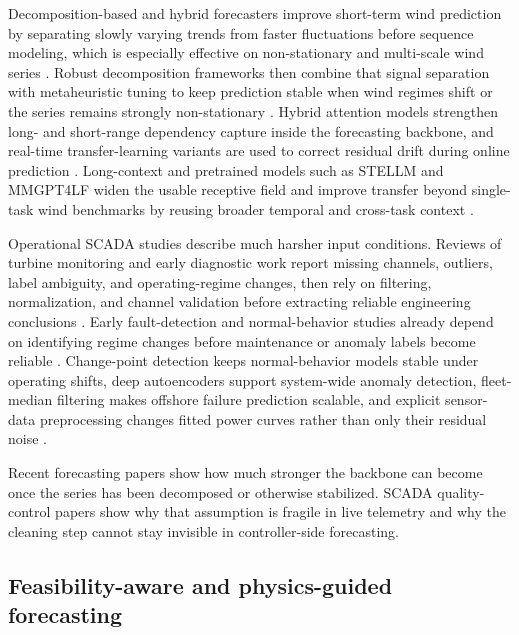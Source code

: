 ﻿\documentclass[review,1p,times]{elsarticle}
\begin{document}
Decomposition-based and hybrid forecasters improve short-term wind prediction by separating slowly varying trends from faster fluctuations before sequence modeling, which is especially effective on non-stationary and multi-scale wind series \citep{verdone2025review,zhang2021windreview,duan2025robust}. Robust decomposition frameworks then combine that signal separation with metaheuristic tuning to keep prediction stable when wind regimes shift or the series remains strongly non-stationary \citep{duan2025robust}. Hybrid attention models strengthen long- and short-range dependency capture inside the forecasting backbone, and real-time transfer-learning variants are used to correct residual drift during online prediction \citep{zhu2025realtime,ma2022gcnwind}. Long-context and pretrained models such as STELLM and MMGPT4LF widen the usable receptive field and improve transfer beyond single-task wind benchmarks by reusing broader temporal and cross-task context \citep{gao2025mmgpt,wu2024stellm}.

Operational SCADA studies describe much harsher input conditions. Reviews of turbine monitoring and early diagnostic work report missing channels, outliers, label ambiguity, and operating-regime changes, then rely on filtering, normalization, and channel validation before extracting reliable engineering conclusions \citep{maldonadocorrea2020slr,sheng2025annreview,yang2013condition,bangalore2018earlyfault}. Early fault-detection and normal-behavior studies already depend on identifying regime changes before maintenance or anomaly labels become reliable \citep{bangalore2018earlyfault,letzgus2020}. Change-point detection keeps normal-behavior models stable under operating shifts, deep autoencoders support system-wide anomaly detection, fleet-median filtering makes offshore failure prediction scalable, and explicit sensor-data preprocessing changes fitted power curves rather than only their residual noise \citep{letzgus2020,renstrom2020autoencoder,vervlimmeren2025scalable,martincalzada2025optimized}.

Recent forecasting papers show how much stronger the backbone can become once the series has been decomposed or otherwise stabilized. SCADA quality-control papers show why that assumption is fragile in live telemetry and why the cleaning step cannot stay invisible in controller-side forecasting.

\subsection{Feasibility-aware and physics-guided forecasting}
\label{subsec:related_physics}
\end{document}
